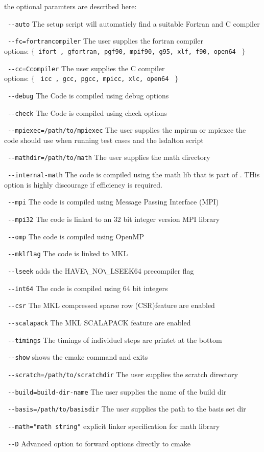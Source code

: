 the optional paramters are described here:
\begin{description}
\item \verb| --auto|     The setup script will automaticly find a suitable Fortran and C compiler
\item   \verb| --fc=fortrancompiler|     The user supplies the fortran compiler\\
 options: $\{ $\verb| ifort , gfortran, pgf90, mpif90, g95, xlf, f90, open64 | $\}$
\item   \verb| --cc=Ccompiler|     The user supplies the C compiler\\
 options: $\{$ \verb| icc , gcc, pgcc, mpicc, xlc, open64 | $\}$
\item  \verb| --debug| The Code is compiled using debug options
\item  \verb| --check| The Code is compiled using check options
\item   \verb| --mpiexec=/path/to/mpiexec|     The user supplies the mpirun or mpiexec the code should use when running test cases and the lsdalton script
\item   \verb| --mathdir=/path/to/math|     The user supplies the math directory
\item   \verb| --internal-math|     The code is compiled using the math lib that is part of {\lsdalton}. THis option is highly discourage if efficiency is required. 
\item   \verb| --mpi|     The code is compiled using Message Passing Interface (MPI) 
\item   \verb| --mpi32|     The code is linked to an 32 bit integer version MPI library 
\item   \verb| --omp|     The code is compiled using OpenMP
\item   \verb| --mklflag|     The code is linked to MKL
\item   \verb| --lseek|     adds the HAVE\verb|\_|NO\verb|\_|LSEEK64 precompiler flag
\item   \verb| --int64|     The code is compiled using 64 bit integers
\item   \verb| --csr|     The MKL compressed sparse row (CSR)feature are enabled
\item   \verb| --scalapack|     The MKL SCALAPACK feature are enabled
\item   \verb| --timings|     The timings of individuel steps are printet at the bottom
\item   \verb| --show|     shows the cmake command and exits
\item   \verb| --scratch=/path/to/scratchdir|     The user supplies the scratch directory
\item   \verb| --build=build-dir-name|     The user supplies the name of the build dir
\item   \verb| --basis=/path/to/basisdir|     The user supplies the path to the basis set dir
\item   \verb| --math="math string"|     explicit linker specification for math library
\item  \verb| --D| Advanced option to forward options directly to cmake
\end{description}

